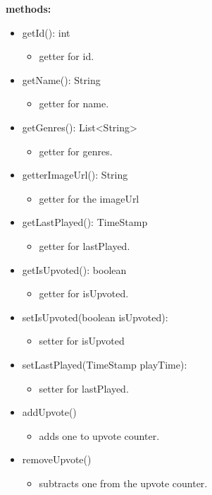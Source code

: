 \documentclass[oneside, ngerman]{sdqtechreport}
\begin{document}
\textbf{methods:}
\begin{itemize}
    \item getId(): int
    \begin{itemize}
        \item getter for id.
    \end{itemize}
    \item getName(): String
    \begin{itemize}
        \item getter for name.
    \end{itemize}
    \item getGenres(): List<String>
    \begin{itemize}
        \item getter for genres.
    \end{itemize}
    \item getterImageUrl(): String
    \begin{itemize}
        \item getter for the imageUrl
    \end{itemize}
    \item getLastPlayed(): TimeStamp
    \begin{itemize}
        \item getter for lastPlayed.
    \end{itemize}
    \item getIsUpvoted(): boolean
    \begin{itemize}
        \item getter for isUpvoted.
    \end{itemize}
    \item setIsUpvoted(boolean isUpvoted):
    \begin{itemize}
        \item setter for isUpvoted
    \end{itemize}
    \item setLastPlayed(TimeStamp playTime):
    \begin{itemize}
        \item setter for lastPlayed.
    \end{itemize}
    \item addUpvote()
    \begin{itemize}
        \item adds one to upvote counter.
    \end{itemize}
    \item removeUpvote()
    \begin{itemize}
        \item subtracts one from the upvote counter.
    \end{itemize}
    
\end{itemize}
\end{document}
